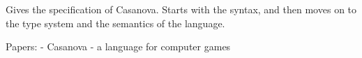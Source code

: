 Gives the specification of Casanova. Starts with the syntax, and then moves on to the type system and the semantics of the language.

Papers:
- Casanova - a language for computer games
